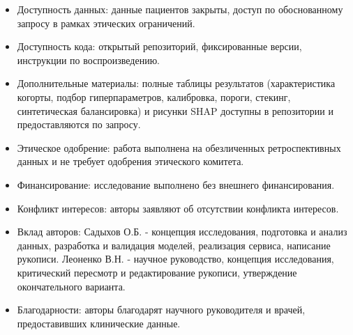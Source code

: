 \documentclass[12pt,a4paper]{article}
\begin{document}
\begin{itemize}[leftmargin=1.4em,itemsep=2pt]
  \item Доступность данных: данные пациентов закрыты, доступ по обоснованному запросу в рамках
        этических ограничений.
  \item Доступность кода: открытый репозиторий, фиксированные версии, инструкции по
        воспроизведению.
  \item Дополнительные материалы: полные таблицы результатов (характеристика когорты, подбор
        гиперпараметров, калибровка, пороги, стекинг, синтетическая балансировка) и рисунки SHAP
        доступны в репозитории и предоставляются по запросу.
  \item Этическое одобрение: работа выполнена на обезличенных ретроспективных данных и не
        требует одобрения этического комитета.
  \item Финансирование: исследование выполнено без внешнего финансирования.
  \item Конфликт интересов: авторы заявляют об отсутствии конфликта интересов.
  \item Вклад авторов: Садыхов О.Б. - концепция исследования, подготовка и анализ данных,
        разработка и валидация моделей, реализация сервиса, написание рукописи. Леоненко В.Н.
        - научное руководство, концепция исследования, критический пересмотр и редактирование
        рукописи, утверждение окончательного варианта.
  \item Благодарности: авторы благодарят научного руководителя и врачей, предоставивших
        клинические данные.
\end{itemize}
\end{document}
